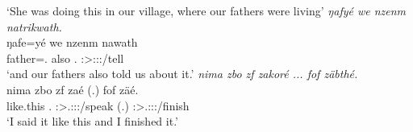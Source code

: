 \begin{exe}
	\trans `She was doing this in our village, where our fathers were living'
	\emph{ŋafyé we nzenm natrikwath.}\\
	\gll ŋafe=yé we nzenm nawath\\
	father=\Erg.{\Nsg} also \Fnsg.{\Dat} \Stpl:\Sbj>\Fpl:\Io:\Pst:\Ipfv/tell\\
	\trans `and our fathers also told us about it.'
	\emph{nima zbo zf zakoré ... fof zäbthé.}\\
	\gll nima zbo zf zaé (.) fof zäé.\\
	like.this \Prox.{\All} {\Imm} \Fsg:\Sbj>\Tsg.\F:\Obj:\Rpst:\Pfv/speak (.) {\Emph} \Fsg:\Sbj>\Tsg.\F:\Obj:\Rpst:\Pfv/finish\\
	\trans `I said it like this and I finished it.'	
\end{exe}%